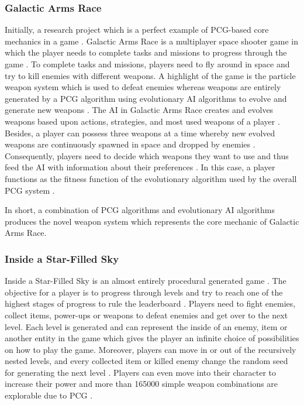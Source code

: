 \documentclass[MGS,Master,english]{twbook}%
\begin{document}
\subsubsection{Galactic Arms Race}
Initially, a research project which is a perfect example of PCG-based core mechanics in a game \cite{game::galacticArmsRace}. Galactic Arms Race is a multiplayer space shooter game in which the player needs to complete tasks and missions to progress through the game \cite{game::galacticArmsRace}. To complete tasks and missions, players need to fly around in space and try to kill enemies with different weapons. A highlight of the game is the particle weapon system which is used to defeat enemies whereas weapons are entirely generated by a PCG algorithm using evolutionary AI algorithms to evolve and generate new weapons \cite{pcg::galacticArmsRace}. The AI in Galactic Arms Race creates and evolves weapons based upon actions, strategies, and most used weapons of a player \cite{pcg::galacticArmsRace} \cite{pcg::galacticArmsRace::evolvingContent}. Besides, a player can possess three weapons at a time whereby new evolved weapons are continuously spawned in space and dropped by enemies \cite{pcg::galacticArmsRace::evolvingContent}. Consequently, players need to decide which weapons they want to use and thus feed the AI with information about their preferences \cite{pcg::galacticArmsRace::evolvingContent}. In this case, a player functions as the fitness function of the evolutionary algorithm used by the overall PCG system \cite{pcg::galacticArmsRace::evolvingContent}.

In short, a combination of PCG algorithms and evolutionary AI algorithms produces the novel weapon system which represents the core mechanic of Galactic Arms Race.

\subsubsection{Inside a Star-Filled Sky}
Inside a Star-Filled Sky is an almost entirely procedural generated game \cite{game::insideAStarFilledSky}. The objective for a player is to progress through levels and try to reach one of the highest stages of progress to rule the leaderboard \cite{game::insideAStarFilledSky}. Players need to fight enemies, collect items, power-ups or weapons to defeat enemies and get over to the next level. Each level is generated and can represent the inside of an enemy, item or another entity in the game which gives the player an infinite choice of possibilities on how to play the game. Moreover, players can move in or out of the recursively nested levels, and every collected item or killed enemy change the random seed for generating the next level \cite{pcg::endlessWeb}. Players can even move into their character to increase their power and more than 165000 simple weapon combinations are explorable due to PCG \cite{game::insideAStarFilledSky}.
\end{document}
